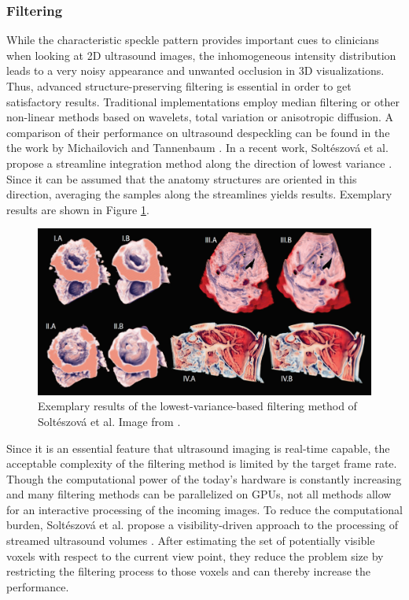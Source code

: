 \subsubsection{Filtering}
While the characteristic speckle pattern provides important cues to clinicians when looking at 2D ultrasound images, the inhomogeneous intensity distribution leads to a very noisy appearance and unwanted occlusion in 3D visualizations.
Thus, advanced structure-preserving filtering is essential in order to get satisfactory results.
Traditional implementations employ median filtering or other non-linear methods based on wavelets, total variation or anisotropic diffusion. 
A comparison of their performance on ultrasound despeckling can be found in the the work by Michailovich and Tannenbaum \cite{Michailovich:2006:Despeckling}.
In a recent work, Soltészová et al. propose a streamline integration method along the direction of lowest variance \cite{Solteszova:2012:UsFiltering}.
Since it can be assumed that the anatomy structures are oriented in this direction, averaging the samples along the streamlines yields  results.
Exemplary results are shown in Figure \ref{fig:background:solteszova-filtering}.
\begin{figure}[ht]
	\centering
	\includegraphics[width=0.75\linewidth]{figures/background/solteszova-filtering.jpg}
	\caption{
		Exemplary results of the lowest-variance-based filtering method of Soltészová et al. Image from \cite{Solteszova:2012:UsFiltering}.
	}
	\label{fig:background:solteszova-filtering}
\end{figure}

Since it is an essential feature that ultrasound imaging is real-time capable, the acceptable complexity of the filtering method is limited by the target frame rate.
Though the computational power of the today's hardware is constantly increasing and many filtering methods can be parallelized on GPUs, not all methods allow for an interactive processing of the incoming images.
To reduce the computational burden, Soltészová et al. propose a visibility-driven approach to the processing of streamed ultrasound volumes \cite{Solteszova:2014:VisibilityStreaming}.
After estimating the set of potentially visible voxels with respect to the current view point, they reduce the problem size by restricting the filtering process to those voxels and can thereby increase the performance.


